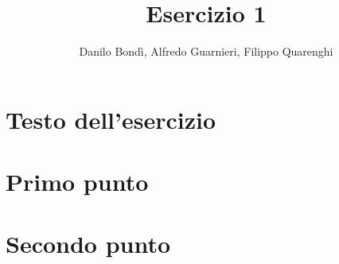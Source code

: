 \documentclass[10pt, titlepage]{article}
\title{\textbf{Esercizio 1}}
\author{Danilo Bondì, Alfredo Guarnieri, Filippo Quarenghi}
\date{}
\begin{document}

\section*{Testo dell'esercizio}


\section*{Primo punto}


\section*{Secondo punto}

\end{document}
